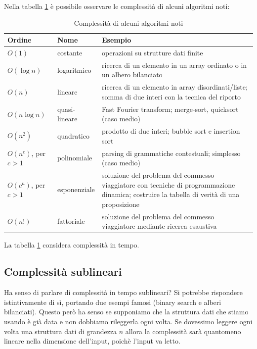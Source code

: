 Nella tabella \ref{algocomp} è possibile osservare le complessità di alcuni algoritmi noti:
\begin{table}[h]
    \begin{tabular}{|l|l|p{7cm}|}
        \hline
        \textbf{Ordine} & \textbf{Nome} & \textbf{Esempio} \\
        \hline
        $O(1)$ & costante & operazioni su strutture dati finite \\
        \hline
        $O(\log n)$ & logaritmico & ricerca di un elemento in un array ordinato o in un albero
        bilanciato \\
        \hline
        $O(n)$ & lineare & ricerca di un elemento in array disordinati/liste; somma di due interi con la
        tecnica del riporto\\
        \hline
        $O(n\log n)$ & quasi-lineare & Fast Fourier transform; merge-sort, quicksort (caso medio)\\
        \hline
        $O(n^{2})$ & quadratico & prodotto di due interi; bubble sort e insertion sort \\
        \hline
        $O(n^{c})$, per $c > 1$ & polinomiale & parsing di grammatiche contestuali; simplesso (caso
        medio)\\
        \hline
        $O(c^{n})$, per $c > 1$ & esponenziale & soluzione del problema del commesso viaggiatore con
        tecniche di programmazione dinamica; costruire la tabella di verità di una proposizione \\
        \hline
        $O(n!)$ & fattoriale & soluzione del problema del commesso viaggiatore mediante ricerca esaustiva \\
        \hline
    \end{tabular}
    \caption{Complessità di alcuni algoritmi noti}
    \label{algocomp}
\end{table}

La tabella \ref{algocomp} considera complessità in tempo.

\subsection{Complessità sublineari}

Ha senso di parlare di complessità in tempo sublineari? Si potrebbe rispondere istintivamente di sì,
portando due esempi famosi (binary search e alberi bilanciati). Questo però ha senso se supponiamo
che la struttura dati che stiamo usando è già data e non dobbiamo rileggerla ogni volta. Se
dovessimo leggere ogni volta una struttura dati di grandezza $n$ allora la complessità sarà
quantomeno lineare nella dimensione dell'input, poichè l'input va letto.

